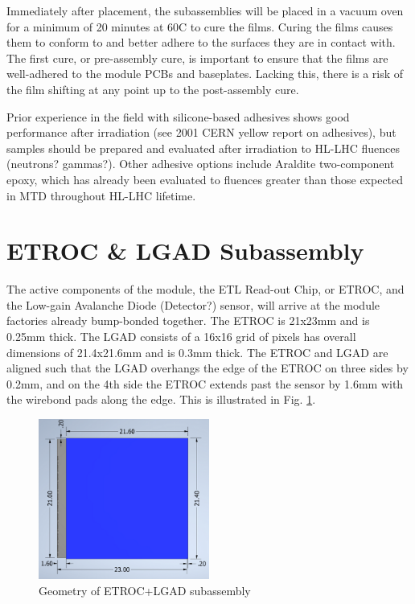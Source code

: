 \documentclass[10pt]{datasheet}
\begin{document}
Immediately after placement, the subassemblies will be placed in a  vacuum oven for a minimum of 20 minutes at 60\degree C to cure the films. Curing the films causes them to conform to and better adhere to the surfaces they are in contact with. The first cure, or pre-assembly cure, is important to ensure that the films are well-adhered to the module PCBs and baseplates. Lacking this, there is a risk of the film shifting at any point up to the post-assembly cure.

Prior experience in the field with silicone-based adhesives shows good performance after irradiation (see 2001 CERN yellow report on adhesives), but samples should be prepared and evaluated after irradiation to HL-LHC fluences (neutrons? gammas?).  Other adhesive options include Araldite two-component epoxy, which has already been evaluated to fluences greater than those expected in MTD throughout HL-LHC lifetime. 

\section{ETROC \& LGAD Subassembly}

The active components of the module, the ETL Read-out Chip, or ETROC, and the Low-gain Avalanche Diode (Detector?) sensor, will arrive at the module factories already bump-bonded together. The ETROC is 21x23mm and is 0.25mm thick. The LGAD consists of a 16x16 grid of pixels has overall dimensions of 21.4x21.6mm and is 0.3mm thick. The ETROC and LGAD are aligned such that the LGAD overhangs the edge of the ETROC on three sides by 0.2mm, and on the 4th side the ETROC extends past the sensor by 1.6mm with the wirebond pads along the edge. This is illustrated in Fig. \ref{fig:bbm-geometry}.

\begin{figure}[h]
	\centering
    \includegraphics[width=0.5\textwidth]{figures/ETROCpLGAD.png}
    \caption{Geometry of ETROC+LGAD subassembly}
    \label{fig:bbm-geometry}	
\end{figure}
\end{document}
